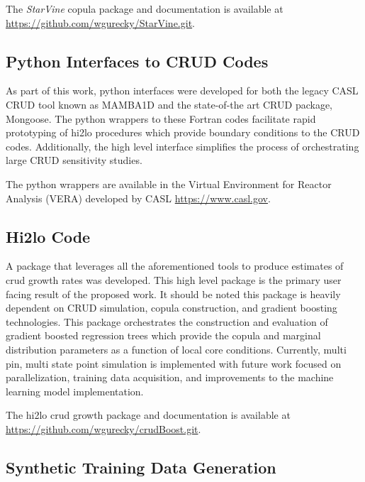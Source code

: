 The \emph{StarVine} copula package and documentation is available at \url{https://github.com/wgurecky/StarVine.git}.

\subsection{Python Interfaces to CRUD Codes}

As part of this work, python interfaces were developed for both the legacy CASL CRUD tool known as MAMBA1D and the state-of-the art CRUD package, Mongoose.  The python wrappers to these Fortran codes facilitate rapid prototyping of hi2lo procedures which provide boundary conditions to the CRUD codes.  Additionally, the high level interface simplifies the process of orchestrating large CRUD sensitivity studies.

The python wrappers are available in the Virtual Environment for Reactor Analysis (VERA) developed by CASL \url{https://www.casl.gov}.

\subsection{Hi2lo Code}

A package that leverages all the aforementioned tools to produce estimates of crud growth rates was developed.  This high level package is the primary user facing result of the proposed work.  It should be noted this package is heavily dependent on CRUD simulation, copula construction, and gradient boosting technologies.
This package orchestrates the construction and evaluation of gradient boosted regression trees which provide the copula and marginal distribution parameters as a function of local core conditions.
Currently, multi pin, multi state point simulation is implemented with future work focused on parallelization, training data acquisition, and improvements to the machine learning model implementation.

The hi2lo crud growth package and documentation is available at \url{https://github.com/wgurecky/crudBoost.git}.


\subsection{Synthetic Training Data Generation}
\label{chap:synth}

